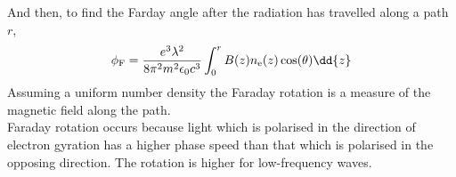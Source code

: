\documentclass{book}         		                %
\begin{document}
And then, to find the Farday angle after the radiation has travelled
along a path $r$,
\begin{equation}
  \label{eq:14}
  \phi_{\rm F} = \frac{e^3  \lambda^2}{8 \pi^2 m^2 \epsilon_0 c^3} \int_0^r B(z) n_{\rm e}(z) \cos(\theta) \dd{z}
\end{equation}
Assuming a uniform number density the Faraday rotation is a measure of
the magnetic field along the path.\\
Faraday rotation occurs because light which is polarised in the
direction of electron gyration has a higher phase speed than that
which is polarised in the opposing direction. The rotation is higher
for low-frequency waves.



  \nocite{*} 

\end{document}
